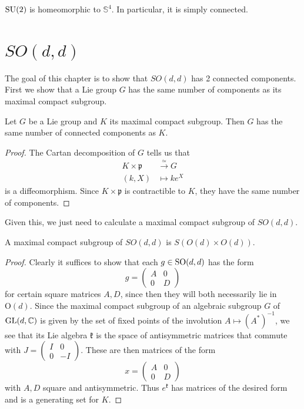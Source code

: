 \documentclass{report}
\begin{document}
\begin{proposition}
    $\operatorname{{\mathrm{SU}}}(2)$ is homeomorphic to $\mathbb S^4$.
    In particular, it is simply connected.
\end{proposition}

\chapter{$SO(d,d)$}
The goal of this chapter is to show that $SO(d,d)$ has 2 connected components.
First we show that a Lie group $G$ has the same number of components as its maximal compact subgroup.
\begin{proposition}
    Let $G$ be a Lie group and $K$ its maximal compact subgroup.
    Then $G$ has the same number of connected components as $K$.
\end{proposition}
\begin{proof}
    The Cartan decomposition of $G$ tells us that 
    \begin{align*}
        K \times \mathfrak p &\overset{\simeq}{\to} G\\
        (k, X) &\mapsto k e^X
    \end{align*}
    is a diffeomorphism.
    Since $K \times \mathfrak p$ is contractible to $K$, they have the same number of components.
\end{proof}
Given this, we just need to calculate a maximal compact subgroup of $SO(d,d)$.
\begin{proposition}
    A maximal compact subgroup of $SO(d,d)$ is $S(O(d) \times O(d))$.
\end{proposition}
\begin{proof}
    Clearly it suffices to show that each $g \in \operatorname{{\mathrm{SO}}}(d,d)$ has the form
    \[
    g = \begin{pmatrix} A & 0 \\ 0 & D \end{pmatrix}
    \]
    for certain square matrices $A, D$, since then they will both necessarily lie in $\mathrm{O}(d)$.
    Since the maximal compact subgroup of an algebraic subgroup $G$ of $\operatorname{{\mathrm{GL}}}(d, \mathbb C)$ is given by the set of fixed points of the involution $A \mapsto (A^*)^{-1}$, we see that its Lie algebra $\mathfrak k$ is the space of antisymmetric matrices that commute with $J = \begin{pmatrix} I & 0 \\ 0 & -I \end{pmatrix}$.
    These are then matrices of the form 
    \[
    x = \begin{pmatrix} A & 0 \\ 0 & D \end{pmatrix}
    \]
    with $A, D$ square and antisymmetric.
    Thus $e^{\mathfrak k}$ has matrices of the desired form and is a generating set for $K$.
\end{proof}
\end{document}
